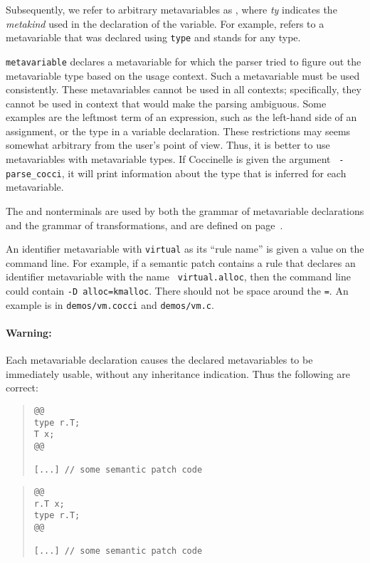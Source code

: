 Subsequently, we refer to arbitrary metavariables as
, where {\it{ty}}
indicates the {\it metakind} used in the declaration of the variable.
For example,  refers to a metavariable
that was declared using \texttt{type} and stands for any type.

{\tt metavariable} declares a metavariable for which the parser tried to
figure out the metavariable type based on the usage context.  Such a
metavariable must be used consistently.  These metavariables cannot be used
in all contexts; specifically, they cannot be used in context that would
make the parsing ambiguous.  Some examples are the leftmost term of an
expression, such as the left-hand side of an assignment, or the type in a
variable declaration.  These restrictions may seems somewhat arbitrary from
the user's point of view.  Thus, it is better to use metavariables with
metavariable types.  If Coccinelle is given the argument {\tt
  -parse\_cocci}, it will print information about the type that is inferred
for each metavariable.

The  and  nonterminals are used by both the grammar of
metavariable declarations and the grammar of transformations, and are
defined on page~\pageref{types}.

An identifier metavariable with {\tt virtual} as its ``rule name'' is given
a value on the command line.  For example, if a semantic patch contains a
rule that declares an identifier metavariable with the name {\tt
  virtual.alloc}, then the command line could contain {\tt -D
  alloc=kmalloc}.  There should not be space around the {\tt =}.  An
example is in {\tt demos/vm.cocci} and {\tt demos/vm.c}.


\paragraph*{Warning:} Each metavariable declaration causes the declared
metavariables to be immediately usable, without any inheritance
indication.  Thus the following are correct:

\begin{quote}
\begin{verbatim}
@@
type r.T;
T x;
@@

[...] // some semantic patch code
\end{verbatim}
\end{quote}

\begin{quote}
\begin{verbatim}
@@
r.T x;
type r.T;
@@

[...] // some semantic patch code
\end{verbatim}
\end{quote}

